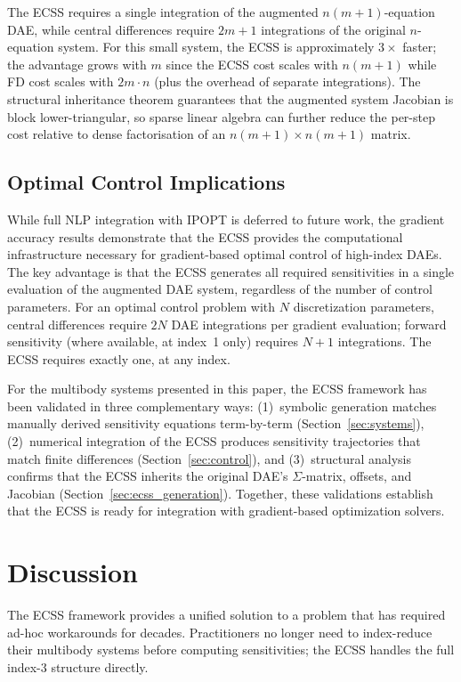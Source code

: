\documentclass[12pt,a4paper]{article}
\theoremstyle{definition}
\theoremstyle{plain}
\begin{document}
The ECSS requires a single integration of the augmented $n(m+1)$-equation DAE, while central differences require $2m+1$ integrations of the original $n$-equation system. For this small system, the ECSS is approximately $3\times$ faster; the advantage grows with $m$ since the ECSS cost scales with $n(m+1)$ while FD cost scales with $2m \cdot n$ (plus the overhead of separate integrations). The structural inheritance theorem guarantees that the augmented system Jacobian is block lower-triangular, so sparse linear algebra can further reduce the per-step cost relative to dense factorisation of an $n(m+1) \times n(m+1)$ matrix.

\subsection{Optimal Control Implications}

While full NLP integration with IPOPT is deferred to future work, the gradient accuracy results demonstrate that the ECSS provides the computational infrastructure necessary for gradient-based optimal control of high-index DAEs. The key advantage is that the ECSS generates all required sensitivities in a single evaluation of the augmented DAE system, regardless of the number of control parameters. For an optimal control problem with $N$ discretization parameters, central differences require $2N$ DAE integrations per gradient evaluation; forward sensitivity (where available, at index~1 only) requires $N+1$ integrations. The ECSS requires exactly one, at any index.

For the multibody systems presented in this paper, the ECSS framework has been validated in three complementary ways: (1)~symbolic generation matches manually derived sensitivity equations term-by-term (Section~\ref{sec:systems}), (2)~numerical integration of the ECSS produces sensitivity trajectories that match finite differences (Section~\ref{sec:control}), and (3)~structural analysis confirms that the ECSS inherits the original DAE's $\Sigma$-matrix, offsets, and Jacobian (Section~\ref{sec:ecss_generation}). Together, these validations establish that the ECSS is ready for integration with gradient-based optimization solvers.

\section{Discussion}

The ECSS framework provides a unified solution to a problem that has required ad-hoc workarounds for decades. Practitioners no longer need to index-reduce their multibody systems before computing sensitivities; the ECSS handles the full index-3 structure directly.
\end{document}
